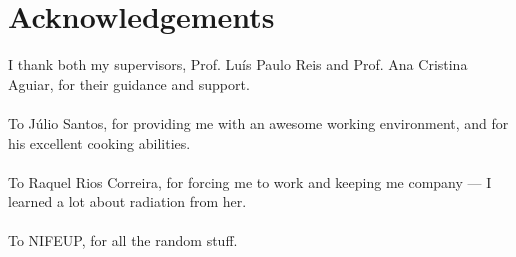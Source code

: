 \chapter*{Acknowledgements}

I thank both my supervisors, Prof. Luís Paulo Reis and Prof. Ana Cristina Aguiar,
for their guidance and support.
\\
\\
To Júlio Santos, for providing me with an awesome working environment, and for
his excellent cooking abilities.
\\
\\
To Raquel Rios Correira, for forcing me to work and keeping me company --- I learned a lot about radiation from her.
\\
\\
To NIFEUP, for all the random stuff.

\vspace{10mm}
